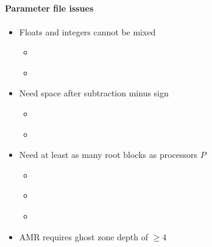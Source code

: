 \NEWSEC

\subsection{\ssIssues}

\begin{frame}[fragile,label=ss-issues] 
\secframetitle{\ssIssues}
\framesubtitle{Parameter file issues}

\begin{itemize}
   \item Floats and integers cannot be mixed
   \begin{itemize}
     \item[\frownie] \textcolor{red}{}
     \item[\smiley] \textcolor{green!50!black}{}
   \end{itemize}

   \item Need space after subtraction minus sign
   \begin{itemize}
     \item[\frownie] \textcolor{red}{}
     \item[\smiley] \textcolor{green!50!black}{}
   \end{itemize}
  \item Need at least as many root blocks as processors $P$
  \begin{itemize}
    \item {}
    \item[\frownie] \textcolor{red}{ }
    \item[\smiley]\textcolor{green!50!black}{ }
  \end{itemize}
  \item AMR requires ghost zone depth of $\ge 4$
\end{itemize}


\end{frame}

